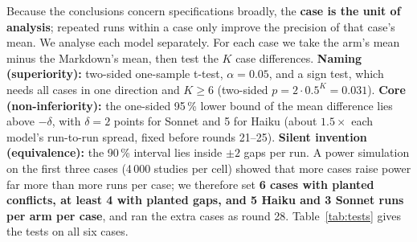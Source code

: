 \documentclass{article}
\begin{document}
Because the conclusions concern specifications broadly, the \textbf{case is the unit of analysis}; repeated runs within a case only improve the precision of that case's mean. We analyse each model separately. For each case we take
the arm's mean minus the Markdown's mean, then test the $K$ case differences.
\textbf{Naming (superiority):} two-sided one-sample t-test, $\alpha = 0.05$, and a sign test, which needs all
cases in one direction and $K \ge 6$ (two-sided $p = 2 \cdot 0.5^K = 0.031$). \textbf{Core
(non-inferiority):} the one-sided 95\,\% lower bound of the mean difference lies above $-\delta$, with
$\delta = 2$ points for Sonnet and 5 for Haiku (about $1.5\times$ each model's run-to-run spread, fixed before
rounds 21--25). \textbf{Silent invention (equivalence):} the 90\,\% interval lies inside $\pm 2$ gaps per run.
A power simulation on the first three cases (4\,000 studies per cell) showed that more cases raise power
far more than more runs per case; we therefore set \textbf{6 cases with planted conflicts, at least 4 with
planted gaps, and 5 Haiku and 3 Sonnet runs per arm per case}, and ran the extra cases as round 28.
Table~\ref{tab:tests} gives the tests on all six cases.
\end{document}
